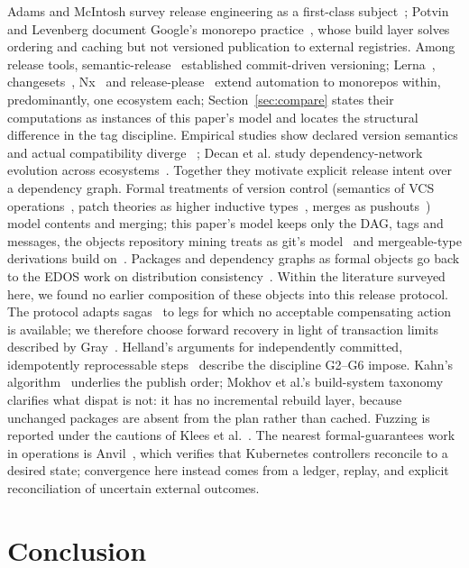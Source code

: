 \documentclass[sigconf,nonacm]{acmart}
\newcommand{\G}[1]{G#1}
\begin{document}
Adams and McIntosh survey release engineering as a first-class
subject~\cite{adams}; Potvin and Levenberg document Google's monorepo
practice~\cite{potvin}, whose build layer solves ordering and caching
but not versioned publication to external registries.
Among release tools, semantic-release~\cite{semanticrelease}
established commit-driven versioning; Lerna~\cite{lerna},
changesets~\cite{changesets}, Nx~\cite{nx} and
release-please~\cite{releaseplease} extend automation to monorepos
within, predominantly, one ecosystem each; Section~\ref{sec:compare}
states their computations as instances of this paper's model and
locates the structural difference in the tag discipline. Empirical studies
show declared version semantics and actual compatibility diverge
~\cite{raemaekers,bogart}; Decan et al. study dependency-network evolution
across ecosystems~\cite{decan}. Together they motivate explicit release
intent over a dependency graph. Formal treatments of
version control (semantics of VCS operations~\cite{swierstraloh},
patch theories as higher inductive types~\cite{hpt}, merges as
pushouts~\cite{mimram}) model contents and merging; this paper's
model keeps only the DAG, tags and messages, the objects repository
mining treats as git's model~\cite{birdgit} and mergeable-type
derivations build on~\cite{mrdt}. Packages and
dependency graphs as formal objects go back to the EDOS work on
distribution consistency~\cite{edos}. Within the literature surveyed here,
we found no earlier composition of these objects into this release protocol.
The protocol adapts sagas~\cite{sagas} to legs for which no acceptable
compensating action is available; we therefore choose forward recovery in
light of transaction limits described by Gray~\cite{gray}. Helland's arguments for
independently committed, idempotently reprocessable
steps~\cite{helland07,helland12} describe the discipline
\G{2}--\G{6} impose. Kahn's algorithm~\cite{kahn} underlies the
publish order; Mokhov et al.'s build-system taxonomy~\cite{mokhov}
clarifies what dispat is not: it has no incremental rebuild layer,
because unchanged packages are absent from the plan rather than
cached. Fuzzing is reported under the cautions of Klees et
al.~\cite{klees}. The nearest formal-guarantees work in operations is
Anvil~\cite{anvil}, which verifies that Kubernetes controllers
reconcile to a desired state; convergence here instead comes from a ledger,
replay, and explicit reconciliation of uncertain external outcomes.

\section{Conclusion}
\label{sec:conclusion}
\end{document}
